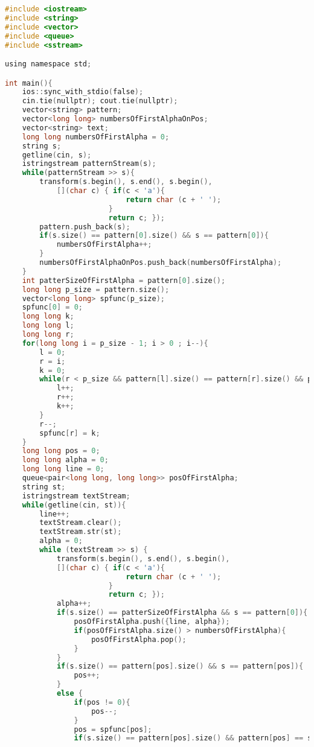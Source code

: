 \begin{lstlisting}[language=C]
#include <iostream>
#include <string>
#include <vector>
#include <queue>
#include <sstream>

using namespace std;

int main(){
    ios::sync_with_stdio(false);
    cin.tie(nullptr); cout.tie(nullptr);
    vector<string> pattern;
    vector<long long> numbersOfFirstAlphaOnPos;
    vector<string> text;
    long long numbersOfFirstAlpha = 0;
    string s;
    getline(cin, s);
    istringstream patternStream(s);
    while(patternStream >> s){
        transform(s.begin(), s.end(), s.begin(),
            [](char c) { if(c < 'a'){
                            return char (c + ' ');
                        }
                        return c; });
        pattern.push_back(s);
        if(s.size() == pattern[0].size() && s == pattern[0]){
            numbersOfFirstAlpha++;
        }
        numbersOfFirstAlphaOnPos.push_back(numbersOfFirstAlpha);
    }
    int patterSizeOfFirstAlpha = pattern[0].size();
    long long p_size = pattern.size();
    vector<long long> spfunc(p_size);
    spfunc[0] = 0;
    long long k;
    long long l;
    long long r;
    for(long long i = p_size - 1; i > 0 ; i--){
        l = 0;
        r = i;
        k = 0;
        while(r < p_size && pattern[l].size() == pattern[r].size() && pattern[l] == pattern[r]) {
            l++;
            r++;
            k++;
        }
        r--;
        spfunc[r] = k;
    }
    long long pos = 0;
    long long alpha = 0;
    long long line = 0;
    queue<pair<long long, long long>> posOfFirstAlpha;
    string st;
    istringstream textStream;
    while(getline(cin, st)){
        line++;
        textStream.clear();
        textStream.str(st);
        alpha = 0;
        while (textStream >> s) {
            transform(s.begin(), s.end(), s.begin(),
            [](char c) { if(c < 'a'){
                            return char (c + ' ');
                        }
                        return c; });
            alpha++;
            if(s.size() == patterSizeOfFirstAlpha && s == pattern[0]){
                posOfFirstAlpha.push({line, alpha});
                if(posOfFirstAlpha.size() > numbersOfFirstAlpha){
                    posOfFirstAlpha.pop();
                }
            }
            if(s.size() == pattern[pos].size() && s == pattern[pos]){
                pos++;
            }
            else {
                if(pos != 0){
                    pos--;
                }
                pos = spfunc[pos];
                if(s.size() == pattern[pos].size() && pattern[pos] == s){

\end{lstlisting}
